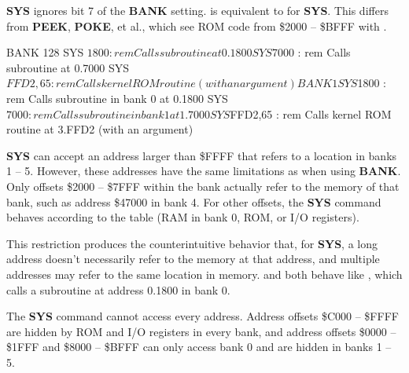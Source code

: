 {\bf SYS} ignores bit 7 of the {\bf BANK} setting.  is
equivalent to  for {\bf SYS}. This differs from {\bf PEEK},
{\bf POKE}, et al., which see ROM code from \$2000 -- \$BFFF with
.

\begin{screencode}
BANK 128
SYS $1800        : rem Calls subroutine at 0.1800
SYS $7000        : rem Calls subroutine at 0.7000
SYS $FFD2,65     : rem Calls kernel ROM routine (with an argument)

BANK 1
SYS $1800        : rem Calls subroutine in bank 0 at 0.1800
SYS $7000        : rem Calls subroutine in bank 1 at 1.7000
SYS $FFD2,65     : rem Calls kernel ROM routine at 3.FFD2 (with an argument)
\end{screencode}

{\bf SYS} can accept an address larger than \$FFFF that refers to a location
in banks 1 -- 5. However, these addresses have the same limitations as when
using {\bf BANK}. Only offsets \$2000 -- \$7FFF within the bank actually refer
to the memory of that bank, such as address \$47000 in bank 4. For other
offsets, the {\bf SYS} command behaves according to the table (RAM in bank 0,
ROM, or I/O registers).

This restriction produces the counterintuitive behavior that, for {\bf SYS}, a
long address doesn't necessarily refer to the memory at that address, and
multiple addresses may refer to the same location in memory. 
and  both behave like , which calls a
subroutine at address 0.1800 in bank 0.


The {\bf SYS} command cannot access every address. Address offsets \$C000 --
\$FFFF are hidden by ROM and I/O registers in every bank, and address offsets
\$0000 -- \$1FFF and \$8000 -- \$BFFF can only access bank 0 and are hidden in
banks 1 -- 5.

